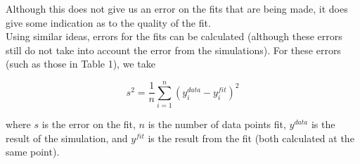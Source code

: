 \documentclass{article}
\begin{document}
\begin{multicols}{2}
Although this does not give us an error on the fits that are being made, it does give some indication as to the quality of the fit.\\

Using similar ideas, errors for the fits can be calculated (although these errors still do not take into account the error from the simulations).  For these errors (such as those in Table 1), we take

\begin{equation}
s^2 = \frac{1}{n} \sum \limits _{i=1} ^{n} (y^{data}_i - y^{fit}_i)^2
\end{equation}

\noindent where $s$ is the error on the fit, $n$ is the number of data points fit, $y^{data}$ is the result of the simulation, and $y^{fit}$ is the result from the fit (both calculated at the same point).  \cite{staterr}

\end{multicols}


\end{document}
